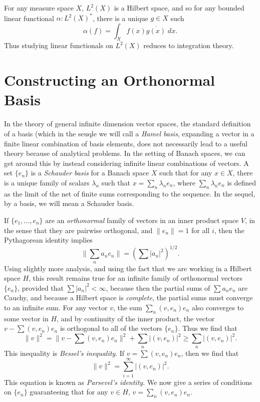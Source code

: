 \begin{example}
    For any measure space $X$, $L^2(X)$ is a Hilbert space, and so for any bounded linear functional $\alpha: L^2(X)^*$, there is a unique $g \in X$ such
    \[ \alpha(f) = \int_X f(x) \overline{g(x)}\; dx. \]
    Thus studying linear functionals on $L^2(X)$ reduces to integration theory.
\end{example}

\section{Constructing an Orthonormal Basis}

In the theory of general infinite dimension vector spaces, the standard definition of a basis (which in the seuqle we will call a \emph{Hamel basis}, expanding a vector in a finite linear combination of basis elements, does not necessarily lead to a useful theory because of analytical problems. In the setting of Banach spaces, we can get around this by instead considering infinite linear combinations of vectors. A set $\{ e_n \}$ is a \emph{Schauder basis} for a Banach space $X$ such that for any $x \in X$, there is a unique family of scalars $\lambda_n$ such that $x = \sum_n \lambda_n e_n$, where $\sum_n \lambda_n e_n$ is defined as the limit of the net of finite sums corresponding to the sequence. In the sequel, by a basis, we will mean a Schauder basis.

If $\{ e_1, \dots, e_n \}$ are an \emph{orthonormal} family of vectors in an inner product space $V$, in the sense that they are pairwise orthogonal, and $\| e_n \| = 1$ for all $i$, then the Pythagorean identity implies
%
\[ \| \sum_n a_ne_n \| = \left( \sum |a_n|^2 \right)^{1/2}. \]
%
Using slightly more analysis, and using the fact that we are working in a Hilbert space $H$, this result remains true for an infinite family of orthonormal vectors $\{ e_n \}$, provided that $\sum |a_n|^2 < \infty$, because then the partial sums of $\sum a_n e_n$ are Cauchy, and because a Hilbert space is \emph{complete}, the partial sums must converge to an infinite sum. For any vector $v$, the sum $\sum_n (v,e_n) e_n$ also converges to some vector in $H$, and by continuity of the inner product, the vector $v - \sum (v,e_n) e_n$ is orthogonal to all of the vectors $\{ e_n \}$. Thus we find that
%
\[ \| v \|^2 = \| v - \sum (v,e_n) e_n \|^2 + \sum_n |(v,e_n)|^2 \geq \sum_n |(v,e_n)|^2. \]
%
This inequality is \emph{Bessel's inequality}. If $v = \sum (v,e_n) e_n$, then we find that
%
\[ \| v \|^2 = \sum_{i = 1}^\infty |(v,e_n)|^2. \]
%
This equation is known as {\it Parsevel's identity}. We now give a series of conditions on $\{ e_n \}$ guaranteeing that for any $v \in H$, $v = \sum_n (v,e_n) e_n$.

